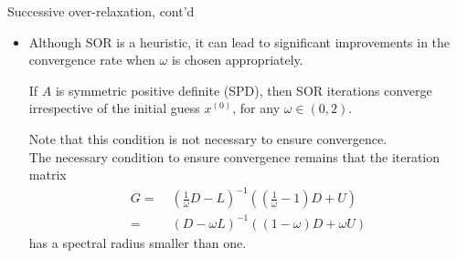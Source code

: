 \documentclass[t,usepdftitle=false]{beamer}
\begin{document}
\begin{frame}{Successive over-relaxation, cont'd}
\begin{itemize}
\item Although SOR is a heuristic, it can lead to significant improvements in the convergence rate when $\omega$ is chosen appropriately.
\begin{theorem}
If $A$ is symmetric positive definite (SPD), then SOR iterations converge irrespective of the initial guess $x^{(0)}$, for any $\omega\in(0,2)$.
\end{theorem}
Note that this condition is not necessary to ensure convergence.\vspace{.1cm}\\
The necessary condition to ensure convergence remains that the iteration matrix 
\begin{align*}
G=&\;\left(\frac{1}{\omega}D-L\right)^{-1}\left((\frac{1}{\omega}-1)D+U\right)\\
=&\;\left(D-\omega L\right)^{-1}\left((1-\omega)D+\omega U\right)
\end{align*}
has a spectral radius smaller than one.
\end{itemize}
\end{frame}
\end{document}
